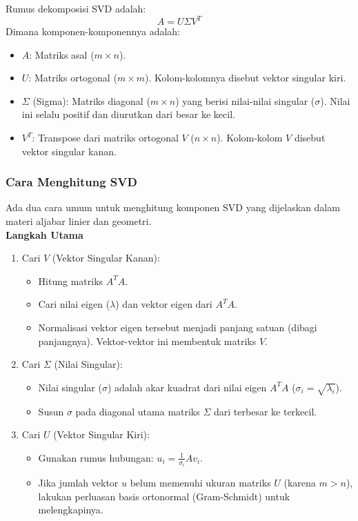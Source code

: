 \documentclass[12pt,a4paper]{article}
\begin{document}
\noindent Rumus dekomposisi SVD adalah:
$$A = U \Sigma V^T$$
Dimana komponen-komponennya adalah:
\begin{itemize}
    \item $A$: Matriks asal ($m \times n$).
    \item $U$: Matriks ortogonal ($m \times m$). Kolom-kolomnya disebut vektor singular kiri.
    \item $\Sigma$ (Sigma): Matriks diagonal ($m \times n$) yang berisi nilai-nilai singular ($\sigma$). Nilai ini selalu positif dan diurutkan dari besar ke kecil.
    \item $V^T$: Transpose dari matriks ortogonal $V$ ($n \times n$). Kolom-kolom $V$ disebut vektor singular kanan.
\end{itemize}

\subsubsection{Cara Menghitung SVD}
Ada dua cara umum untuk menghitung komponen SVD yang dijelaskan dalam materi aljabar linier dan geometri\cite{algeo2025}.\\

\noindent \textbf{Langkah Utama}
\begin{enumerate}
    \item Cari $V$ (Vektor Singular Kanan):
    \begin{itemize}
        \item Hitung matriks $A^T A$.
        \item Cari nilai eigen ($\lambda$) dan vektor eigen dari $A^T A$.
        \item Normalisasi vektor eigen tersebut menjadi panjang satuan (dibagi panjangnya). Vektor-vektor ini membentuk matriks $V$.
    \end{itemize}
    \item Cari $\Sigma$ (Nilai Singular):
    \begin{itemize}
        \item Nilai singular ($\sigma$) adalah akar kuadrat dari nilai eigen $A^T A$ ($\sigma_i = \sqrt{\lambda_i}$).
        \item Susun $\sigma$ pada diagonal utama matriks $\Sigma$ dari terbesar ke terkecil.
    \end{itemize}
    \item Cari $U$ (Vektor Singular Kiri):
    \begin{itemize}
        \item Gunakan rumus hubungan: $u_i = \frac{1}{\sigma_i} A v_i$.
        \item Jika jumlah vektor $u$ belum memenuhi ukuran matriks $U$ (karena $m > n$), lakukan perluasan basis ortonormal (Gram-Schmidt) untuk melengkapinya.
    \end{itemize}
\end{enumerate}
\end{document}
